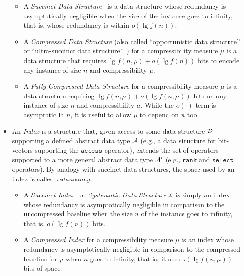 \documentclass[a4paper,10pt]{article}
\newcommand{\access}{\ensuremath{\texttt{access}}}
\newcommand{\rank}{\ensuremath{\texttt{rank}}}
\newcommand{\select}{\ensuremath{\texttt{select}}}
\newcommand{\abstractDataType}{\ensuremath{{\cal A}}}
\begin{document}
\begin{itemize}
\begin{itemize}
\item A \emph{Succinct Data Structure}~\cite{1989-FOCS-SpaceEfficientStaticTreesAndGraphs-Jacobson} is a data structure whose redundancy is asymptotically negligible when the size of the instance goes to infinity, that is, whose redundancy is within $o(\lg f(n))$.
\item A {\em Compressed Data Structure} (also called ``opportunistic data structure''~\cite{2004-Algoritmica-EngineeringAlightweightSuffixArrayConstructionAlgorithm-ManziniFerragina} or ``ultra-succinct data structure''~\cite{2007-SODA-UltraSuccinctRepresentationOfORderedTrees-JanssonSadakaneSung}) for a compressibility measure $\mu$ is a data structure that requires $\lg f(n,\mu) + o(\lg f(n))$ bits to encode any instance of size $n$ and compressibility $\mu$.
\item A {\em Fully-Compressed Data Structure} for a compressibility measure $\mu$ is a data structure requiring $\lg f(n,\mu) + o(\lg f(n,\mu))$ bits on any instance of size $n$ and compressibility $\mu$. While the $o(\cdot)$ term is asymptotic in $n$, it is useful to allow $\mu$ to depend on $n$ too.
\end{itemize}

\item An \emph{Index} is a structure that, given access to some data structure $\cal D$ supporting a defined abstract data type $\abstractDataType$ (e.g., a data structure for bit-vectors supporting the {\access} operator), extends the set of operators supported to a more general abstract data type $\abstractDataType'$ (e.g., {\rank} and {\select} operators).  By analogy with succinct data structures, the space used by an index is called \emph{redundancy}.
  \begin{itemize}
\item A \emph{Succinct Index}~\cite{2011-TALG-SuccinctIndexesForStringsBinaryRelationsAndMultiLabeledTrees-BarbayHeMunroRao} or \emph{Systematic Data Structure} $\cal I$ is simply an index whose redundancy is asymptotically negligible in comparison to the uncompressed baseline when the size $n$ of the instance goes to infinity, that is, $o(\lg f(n))$ bits.

\item A \emph{Compressed Index} for a compressibility measure $\mu$ is an index whose redundancy is asymptotically negligible in comparison to the compressed baseline for $\mu$ when $n$ goes to infinity, that is, it uses $o(\lg f(n,\mu))$ bits of space.
  \end{itemize}

\end{itemize}
\end{document}
